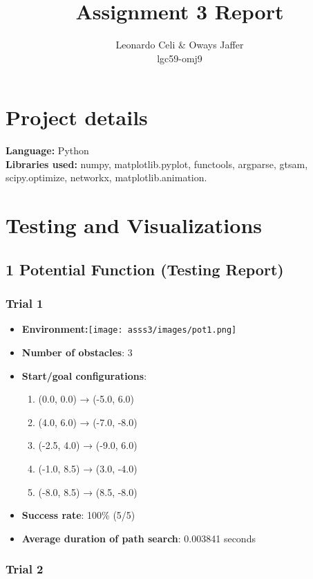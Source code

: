 \documentclass{article}
\title{Assignment 3 Report}
\author{Leonardo Celi \& Oways Jaffer \\ lgc59-omj9}
\date{}
\begin{document}
\maketitle

\section*{Project details}

\noindent \textbf{Language:} Python \\
\textbf{Libraries used:}  numpy, matplotlib.pyplot, functools, argparse, gtsam, scipy.optimize, networkx, matplotlib.animation.
\section*{Testing and Visualizations}
\subsection*{1 Potential Function (Testing Report)}
\subsubsection{Trial 1}

\begin{itemize}
    \item \textbf{Environment:}\texttt{[image: asss3/images/pot1.png]}
    \item \textbf{Number of obstacles}: 3
    \item \textbf{Start/goal configurations}: 
    \begin{enumerate}
        \item (0.0, 0.0) → (-5.0, 6.0)
        \item (4.0, 6.0) → (-7.0, -8.0)
        \item (-2.5, 4.0) → (-9.0, 6.0)
        \item (-1.0, 8.5) → (3.0, -4.0)
        \item (-8.0, 8.5) → (8.5, -8.0)
    \end{enumerate}
    \item \textbf{Success rate}: 100\% (5/5)
    \item \textbf{Average duration of path search}: 0.003841 seconds
\end{itemize}

\subsubsection{Trial 2}
\end{document}
